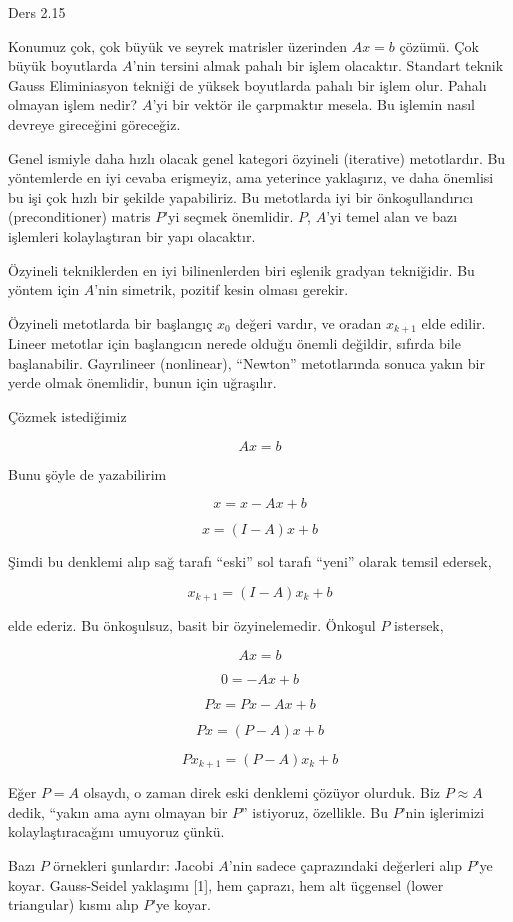 \documentclass[12pt,fleqn]{article}\usepackage{../../common}
\begin{document}
Ders 2.15

Konumuz çok, çok büyük ve seyrek matrisler üzerinden $Ax = b$ çözümü. Çok
büyük boyutlarda $A$'nin tersini almak pahalı bir işlem olacaktır. Standart
teknik Gauss Eliminiasyon tekniği de yüksek boyutlarda pahalı bir işlem
olur. Pahalı olmayan işlem nedir? $A$'yi bir vektör ile çarpmaktır
mesela. Bu işlemin nasıl devreye gireceğini göreceğiz.

Genel ismiyle daha hızlı olacak genel kategori özyineli (iterative)
metotlardır. Bu yöntemlerde en iyi cevaba erişmeyiz, ama yeterince
yaklaşırız, ve daha önemlisi bu işi çok hızlı bir şekilde
yapabiliriz. Bu metotlarda iyi bir önkoşullandırıcı (preconditioner)
matris $P$'yi seçmek önemlidir. $P$, $A$'yi temel alan ve bazı işlemleri
kolaylaştıran bir yapı olacaktır. 

Özyineli tekniklerden en iyi bilinenlerden biri eşlenik gradyan
tekniğidir. Bu yöntem için $A$'nin simetrik, pozitif kesin olması gerekir.

Özyineli metotlarda bir başlangıç $x_0$ değeri vardır, ve oradan $x_{k+1}$
elde edilir. Lineer metotlar için başlangıcın nerede olduğu önemli
değildir, sıfırda bile başlanabilir. Gayrılineer (nonlinear), ``Newton''
metotlarında sonuca yakın bir yerde olmak önemlidir, bunun için uğraşılır.

Çözmek istediğimiz 

$$ Ax = b $$

Bunu şöyle de yazabilirim 

$$ x = x - Ax + b $$

$$ x = (I - A)x + b $$

Şimdi bu denklemi alıp sağ tarafı ``eski'' sol tarafı ``yeni'' olarak
temsil edersek,

$$ x_{k+1} = (I - A)x_k + b $$

elde ederiz. Bu önkoşulsuz, basit bir özyinelemedir. Önkoşul $P$ istersek,

$$ Ax = b $$

$$ 0 = -Ax + b $$

$$ Px = Px - Ax + b $$

$$ Px = (P -A)x + b $$

$$ Px_{k+1} =  (P - A)x_k + b $$

Eğer $P = A$ olsaydı, o zaman direk eski denklemi çözüyor olurduk.  
Biz $P\approx A$ dedik, ``yakın ama aynı olmayan bir $P$'' istiyoruz,
özellikle. Bu $P$'nin işlerimizi kolaylaştıracağını umuyoruz çünkü.

Bazı $P$ örnekleri şunlardır: Jacobi $A$'nin sadece çaprazındaki değerleri
alıp $P$'ye koyar. Gauss-Seidel yaklaşımı [1], hem çaprazı, hem alt üçgensel
(lower triangular) kısmı alıp $P$'ye koyar.
\end{document}
